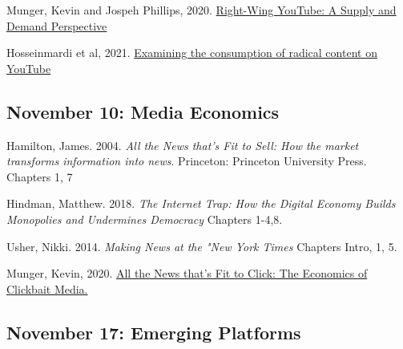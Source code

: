 \vspace{-.1in}\documentclass[11pt]{article}
\begin{document}
\noindent Munger, Kevin and Jospeh Phillips, 2020. \href{https://journals.sagepub.com/doi/pdf/10.1177/1940161220964767?casa_token=pNSl7u_rBX0AAAAA:mlH30Wrj5NEIp9nMD459qqBLaUCBlFjwjCwMSGSmd60OIeuomF4XxXH5eBfzk6A3rcmrDE3I9nmK}{Right-Wing YouTube: A Supply and Demand Perspective
}

\noindent Hosseinmardi et al, 2021.  \href{https://www.pnas.org/content/pnas/118/32/e2101967118.full.pdf?casa_token=vI6yIQS3_M8AAAAA:HCt5StQUZ6kzh4X37RqDc0S7qJibnx9wya3wLUZVHjP-Fij7eNUKP1Wb1kpTPFG4k7yvUoRlpdBMEQ}{Examining the consumption of radical content
	on YouTube
}






\subsection*{November 10: Media Economics}

%

\noindent Hamilton, James. 2004. {\it All the News that's Fit to Sell: How the market transforms information into news}. Princeton: Princeton University Press. Chapters 1, 7

\noindent Hindman, Matthew. 2018. \textit{The Internet Trap: How the Digital Economy Builds Monopolies and Undermines Democracy} Chapters 1-4,8.


\noindent Usher, Nikki. 2014. \textit{Making News at the "New York Times} Chapters Intro, 1, 5.

\noindent Munger, Kevin, 2020. \href{https://www.tandfonline.com/doi/pdf/10.1080/10584609.2019.1687626?casa_token=VSjjEXja4EMAAAAA:Q47ASc0lu3itcu7FAjqifqtnrFQvGFvwCJvG9mE1-g7SDLjLNheR6ZtkURoLvRyW7LRFwxmFR0Di}{All the News that's Fit to Click: The Economics of Clickbait Media.}









\subsection*{November 17: Emerging Platforms}
\end{document}

